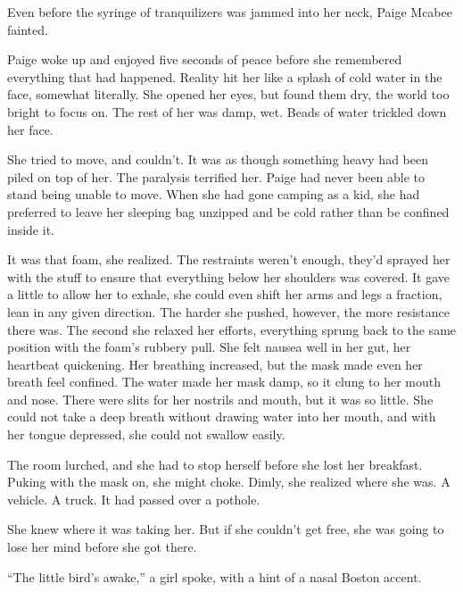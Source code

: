 Even before the syringe of tranquilizers was jammed into her neck, Paige Mcabee fainted.



\sectionbreak



Paige woke up and enjoyed five seconds of peace before she remembered everything that had happened.  Reality hit her like a splash of cold water in the face, somewhat literally.  She opened her eyes, but found them dry, the world too bright to focus on.  The rest of her was damp, wet.  Beads of water trickled down her face.



She tried to move, and couldn't.  It was as though something heavy had been piled on top of her.  The paralysis terrified her.  Paige had never been able to stand being unable to move.  When she had gone camping as a kid, she had preferred to leave her sleeping bag unzipped and be cold rather than be confined inside it.



It was that foam, she realized.  The restraints weren't enough, they'd sprayed her with the stuff to ensure that everything below her shoulders was covered.  It gave a little to allow her to exhale, she could even shift her arms and legs a fraction, lean in any given direction. The harder she pushed, however, the more resistance there was.  The second she relaxed her efforts, everything sprung back to the same position with the foam's rubbery pull.  She felt nausea well in her gut, her heartbeat quickening.  Her breathing increased, but the mask made even her breath feel confined.  The water made her mask damp, so it clung to her mouth and nose.  There were slits for her nostrils and mouth, but it was so little.  She could not take a deep breath without drawing water into her mouth, and with her tongue depressed, she could not swallow easily.



The room lurched, and she had to stop herself before she lost her breakfast.  Puking with the mask on, she might choke.  Dimly, she realized where she was.  A vehicle.  A truck.  It had passed over a pothole.



She knew where it was taking her.  But if she couldn't get free, she was going to lose her mind before she got there.



``The little bird's awake,'' a girl spoke, with a hint of a nasal Boston accent.



